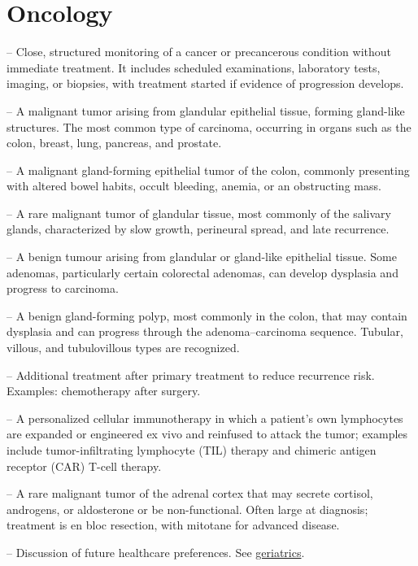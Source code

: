 \chapter{Oncology}

-- Close, structured monitoring of a cancer or precancerous condition without immediate treatment. It includes scheduled examinations, laboratory tests, imaging, or biopsies, with treatment started if evidence of progression develops.

-- A malignant tumor arising from glandular epithelial tissue, forming gland-like structures. The most common type of carcinoma, occurring in organs such as the colon, breast, lung, pancreas, and prostate.

-- A malignant gland-forming epithelial tumor of the colon, commonly presenting with altered bowel habits, occult bleeding, anemia, or an obstructing mass.

-- A rare malignant tumor of glandular tissue, most commonly of the salivary glands, characterized by slow growth, perineural spread, and late recurrence.

-- A benign tumour arising from glandular or gland-like epithelial tissue. Some adenomas, particularly certain colorectal adenomas, can develop dysplasia and progress to carcinoma.

-- A benign gland-forming polyp, most commonly in the colon, that may contain dysplasia and can progress through the adenoma--carcinoma sequence. Tubular, villous, and tubulovillous types are recognized.

-- Additional treatment after primary treatment to reduce recurrence risk. Examples: chemotherapy after surgery.

-- A personalized cellular immunotherapy in which a patient's own lymphocytes are expanded or engineered ex vivo and reinfused to attack the tumor; examples include tumor-infiltrating lymphocyte (TIL) therapy and chimeric antigen receptor (CAR) T-cell therapy.

-- A rare malignant tumor of the adrenal cortex that may secrete cortisol, androgens, or aldosterone or be non-functional. Often large at diagnosis; treatment is en bloc resection, with mitotane for advanced disease.

-- Discussion of future healthcare preferences. See \hyperlink{Geriatrics}{geriatrics}.

